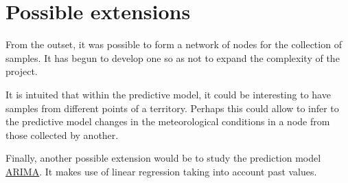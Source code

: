 \section{Possible extensions}
From the outset, it was possible to form a network of nodes for the collection of samples. It has begun to develop one so as not to expand the complexity of the project.

It is intuited that within the predictive model, it could be interesting to have samples from different points of a territory. Perhaps this could allow to infer to the predictive model changes in the meteorological conditions in a node from those collected by another.

Finally, another possible extension would be to study the prediction model \href{https://www.analyticsvidhya.com/blog/2016/02/time-series-forecasting-codes-python/}{ARIMA}. It makes use of linear regression taking into account past values.